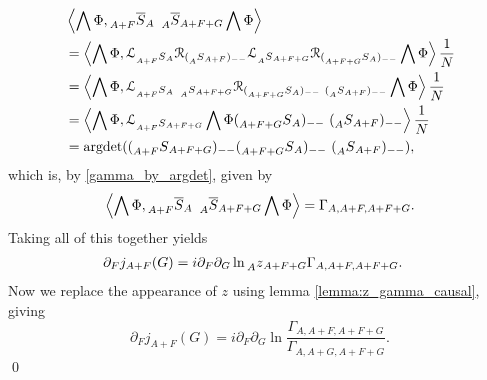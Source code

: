 \documentclass[oneside,reqno,12pt]{amsart}
\begin{document}
\begin{align*}
&\left \langle  \bigwedge \Phi, \prescript{}{A+F}{\overline{S}}_A ~\prescript{}{A}{\overline{S}}_{A+F+G}  \bigwedge \Phi\right\rangle\\
&=\left\langle  \bigwedge \Phi, \mathcal{L}_{\prescript{}{A+F}{S}_A} \mathcal{R}_{(\prescript{}{A}{S}_{A+F})_{--}} \mathcal{L}_{\prescript{}{A}{S}_{A+F+G}} \mathcal{R}_{(\prescript{}{A+F+G}{S}_A)_{--}} \bigwedge \Phi \right\rangle \frac{1}{N}\\
&=\left\langle  \bigwedge \Phi,  \mathcal{L}_{\prescript{}{A+F}{S}_A~\prescript{}{A}{S}_{A+F+G}} \mathcal{R}_{(\prescript{}{A+F+G}{S}_A)_{--}~(\prescript{}{A}{S}_{A+F})_{--}} \bigwedge \Phi \right\rangle \frac{1}{N}\\
&=\left\langle  \bigwedge \Phi,  \mathcal{L}_{\prescript{}{A+F}{S}_{A+F+G}} \bigwedge \Phi (\prescript{}{A+F+G}{S}_A)_{--}~(\prescript{}{A}{S}_{A+F})_{--} \right\rangle \frac{1}{N}\\
&=\text{argdet}((\prescript{}{A+F}{S}_{A+F+G})_{--}(\prescript{}{A+F+G}{S}_A)_{--}~(\prescript{}{A}{S}_{A+F})_{--}),
\end{align*}
which is, by \eqref{gamma_by_argdet}, given by
\begin{equation}
\left \langle  \bigwedge \Phi, \prescript{}{A+F}{\overline{S}}_A ~\prescript{}{A}{\overline{S}}_{A+F+G}  \bigwedge \Phi\right\rangle = \Gamma_{A,A+F,A+F+G}.
\end{equation}
Taking all of this together yields
\begin{align*}
&\partial_F j_{A+F}(G)=i \partial_F \partial_G \ln  \prescript{}{A}{z}_{A+F+G} \Gamma_{A,A+F,A+F+G}.
\end{align*}
Now we replace the appearance of \(z\) using lemma \ref{lemma:z_gamma_causal}, giving
\begin{equation}
\partial_F j_{A+F}(G)=i \partial_F \partial_G \ln \frac{\Gamma_{A,A+F,A+F+G}}{\Gamma_{A,A+G,A+F+G}}.
\end{equation}
\qed
\end{document}
